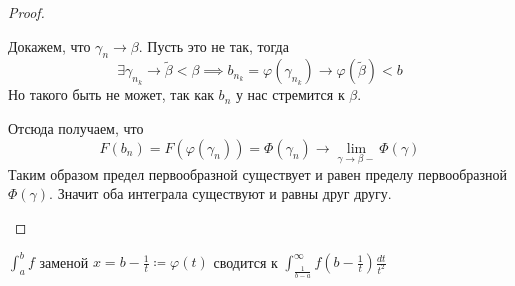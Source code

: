 \begin{enumerate}
\begin{proof}
\begin{enumerate}[1)]
      Докажем, что $\gamma_n \to \beta$. Пусть это не так, тогда
      \begin{equation*}
        \exists \gamma_{n_k} \to \widetilde{\beta} < \beta \implies b_{n_k} = \varphi(\gamma_{n_k}) \to \varphi(\widetilde{\beta}) < b
      \end{equation*}
      Но такого быть не может, так как $b_n$ у нас стремится к $\beta$.

      Отсюда получаем, что
      \begin{equation*}
        F(b_n) = F(\varphi(\gamma_n)) = \Phi(\gamma_n) \to \lim\limits_{\gamma \to \beta-} \Phi(\gamma)
      \end{equation*}
      Таким образом предел первообразной существует и равен пределу первообразной $\Phi(\gamma)$. Значит оба интеграла существуют и равны друг другу.
    \end{enumerate}
  \end{proof}
\end{enumerate}

\begin{notice}
  $\displaystyle \int_{a}^{b} f$ заменой $x = b - \frac{1}{t} \coloneqq \varphi(t)$ сводится к
  $\displaystyle \int_{\frac{1}{b - a}}^{\infty} f(b - \frac{1}{t})\frac{dt}{t^2}$
\end{notice}

